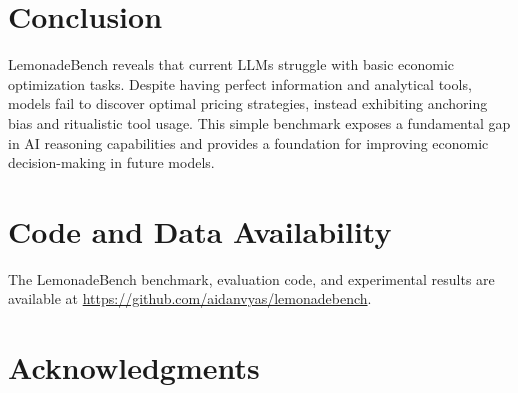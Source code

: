 \documentclass[11pt]{article}
\begin{document}
\section{Conclusion}

LemonadeBench reveals that current LLMs struggle with basic economic optimization tasks. Despite having perfect information and analytical tools, models fail to discover optimal pricing strategies, instead exhibiting anchoring bias and ritualistic tool usage. This simple benchmark exposes a fundamental gap in AI reasoning capabilities and provides a foundation for improving economic decision-making in future models.

\section*{Code and Data Availability}

The LemonadeBench benchmark, evaluation code, and experimental results are available at \url{https://github.com/aidanvyas/lemonadebench}.

\section*{Acknowledgments}




\end{document}
